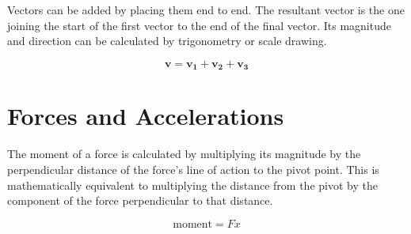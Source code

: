\documentclass[main.tex]{subfiles}
\begin{document}
Vectors can be added by placing them end to end. The resultant vector is the one joining the start of the first vector to the end of the final vector. Its magnitude and direction can be calculated by trigonometry or scale drawing.

\begin{figure}[h]
	\begin{center}
	$$\mathbf{v} = \mathbf{v_1}+\mathbf{v_2}+\mathbf{v_3}$$
	\end{center}
\end{figure}

\section{Forces and Accelerations}


The moment of a force is calculated by multiplying its magnitude by the perpendicular distance of the force's line of action to the pivot point. This is mathematically equivalent to multiplying the distance from the pivot by the component of the force perpendicular to that distance.

\begin{figure}[h]
	\centering
	$$\mathrm{moment} = Fx $$
\end{figure}
\end{document}

